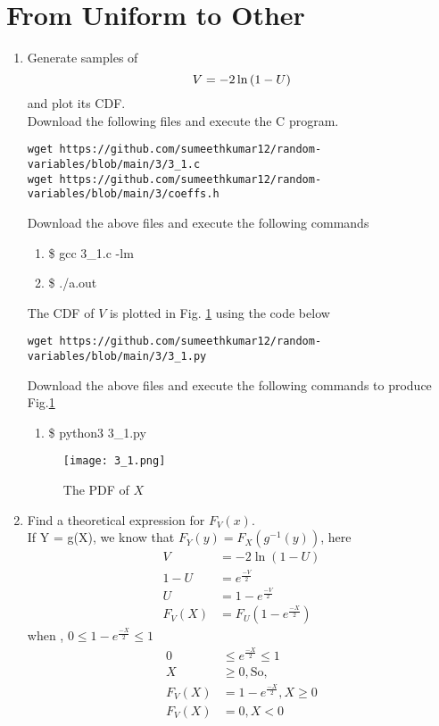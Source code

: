 \documentclass[journal,12pt,twocolumn]{IEEEtran}
\begin{document}
\section{From Uniform to Other}
\begin{enumerate}[label=\thesection.\arabic*
,ref=\thesection.\theenumi]
%
\item
Generate samples of 
%
\begin{equation}
V = -2\ln\left(1-U\right)
\end{equation}
%
and plot its CDF.  \\
\solution Download the following files and execute the  C program.
\begin{lstlisting}
wget https://github.com/sumeethkumar12/random-variables/blob/main/3/3_1.c
wget https://github.com/sumeethkumar12/random-variables/blob/main/3/coeffs.h
\end{lstlisting}
Download the above files and execute the following commands
\begin{enumerate}
    \item \$ gcc 3\_1.c -lm
    \item \$ ./a.out
    \end{enumerate}
The CDF of $V$ is plotted in Fig. \ref{fig:3.1} using the code below
\begin{lstlisting}
wget https://github.com/sumeethkumar12/random-variables/blob/main/3/3_1.py
\end{lstlisting}
Download the above files and execute the following commands to produce Fig.\ref{fig:3.1}
\begin{enumerate}
    \item \$ python3 3\_1.py
\end{enumerate}
\begin{figure}[!h]
\centering
\texttt{[image: 3\_1.png]}\\
\caption{The PDF of $X$}
\label{fig:3.1}
\end{figure}
\item Find a theoretical expression for $F_V(x)$.\\
\solution
If Y = g(X), we know that $F_Y(y) = F_X(g^{-1}(y))$, here 
\begin{align}
V &= -2\ln{(1-U)} \\
1-U &= e^{\frac{-V}{2}}\\
U &= 1 - e^{\frac{-V}{2}} \\ 
F_V(X) &= F_U(1 - e^{\frac{-X}{2}}) 
\end{align}
 when , $0 \le 1 - e^{\frac{-X}{2}} \le 1$
 \begin{align}
 0 &\le e^{\frac{-X}{2}} \le 1 \\
  X &\ge 0 , \text{So,} \\ 
  F_V(X) &= 1 - e^{\frac{-X}{2}}, X \ge 0 \\
  F_V(X) &= 0 , X < 0 
 \end{align}

\end{enumerate}
\end{document}
